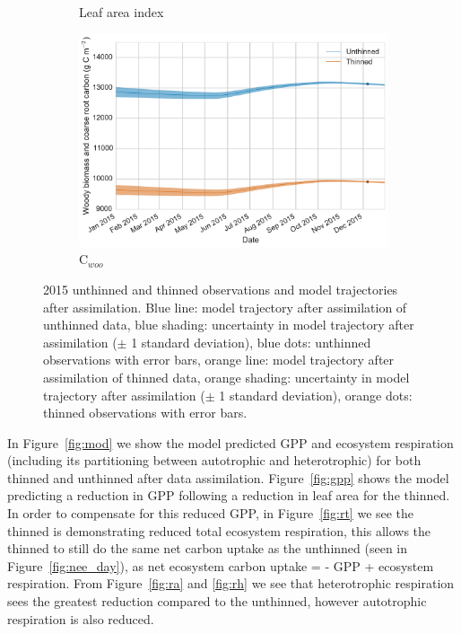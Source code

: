 \documentclass[12pt]{article}
\begin{document}
\begin{figure}[ht]
\begin{subfigure}[b]{0.48\textwidth}
        \caption{Leaf area index}
        \label{fig:lai}
    \end{subfigure}
    \begin{subfigure}[b]{0.48\textwidth}
        \includegraphics[width=\textwidth]{c_woo.pdf}
        \caption{C\(_{woo}\)}
        \label{fig:c_woo}
    \end{subfigure}
    \caption{2015 unthinned and thinned observations and model trajectories after assimilation. Blue line: model trajectory after assimilation of unthinned data, blue shading: uncertainty in model trajectory after assimilation (\(\pm\) 1 standard deviation), blue dots: unthinned observations with error bars, orange line: model trajectory after assimilation of thinned data, orange shading: uncertainty in model trajectory after assimilation (\(\pm\) 1 standard deviation), orange dots: thinned observations with error bars.} \label{fig:obs_mod}
\end{figure}

In Figure~\ref{fig:mod} we show the model predicted GPP and ecosystem respiration (including its partitioning between autotrophic and heterotrophic) for both thinned and unthinned after data assimilation. Figure~\ref{fig:gpp} shows the model predicting a reduction in GPP following a reduction in leaf area for the thinned. In order to compensate for this reduced GPP, in Figure~\ref{fig:rt} we see the thinned is demonstrating reduced total ecosystem respiration, this allows the thinned to still do the same net carbon uptake as the unthinned (seen in Figure~\ref{fig:nee_day}), as net ecosystem carbon uptake = - GPP + ecosystem respiration. From Figure~\ref{fig:ra} and \ref{fig:rh} we see that heterotrophic respiration sees the greatest reduction compared to the unthinned, however autotrophic respiration is also reduced. 
\end{document}
